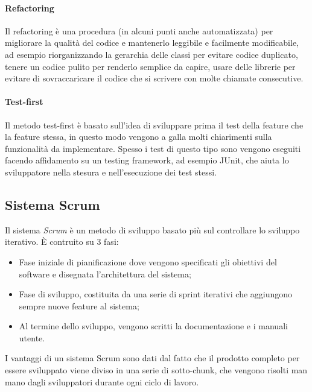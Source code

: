 \documentclass[a4paper, 10pt]{article}
\begin{document}
		\paragraph{Refactoring} Il refactoring è una procedura (in alcuni punti anche automatizzata) per migliorare la qualità del codice e mantenerlo leggibile e facilmente modificabile, ad esempio riorganizzando la gerarchia delle classi per evitare codice duplicato, tenere un codice pulito per renderlo semplice da capire, usare delle librerie per evitare di sovraccaricare il codice che si scrivere con molte chiamate consecutive.
		
		\paragraph{Test-first} Il metodo test-first è basato sull'idea di sviluppare prima il test della feature che la feature stessa, in questo modo vengono a galla molti chiarimenti sulla funzionalità da implementare. Spesso i test di questo tipo sono vengono eseguiti facendo affidamento su un testing framework, ad esempio JUnit, che aiuta lo sviluppatore nella stesura e nell'esecuzione dei test stessi.
		
	\subsection{Sistema Scrum}
		Il sistema \textit{Scrum} è un metodo di sviluppo basato più sul controllare lo sviluppo iterativo. È contruito su 3 fasi:
		\begin{itemize}
			\item Fase iniziale di pianificazione dove vengono specificati gli obiettivi del software e disegnata l'architettura del sistema;
			\item Fase di sviluppo, costituita da una serie di sprint iterativi che aggiungono sempre nuove feature al sistema;
			
			\item Al termine dello sviluppo, vengono scritti la documentazione e i manuali utente.
		\end{itemize}
		I vantaggi di un sistema Scrum sono dati dal fatto che il prodotto completo per essere sviluppato viene diviso in una serie di sotto-chunk, che vengono risolti man mano dagli sviluppatori durante ogni ciclo di lavoro.
		
\end{document}

